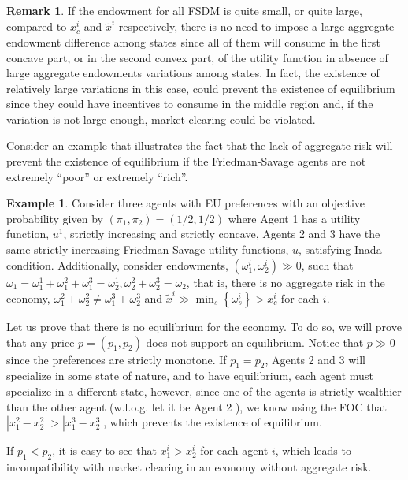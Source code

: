 \documentclass[pdftex]{article}
\numberwithin{equation}{section}
\theoremstyle{th}
\newtheorem{proof lemma}{{Proof Lemma}.}
\theoremstyle{definition}
\newtheorem{example}{Example}%
\newtheorem{remark}{Remark}%
\newtheorem*{risk lovers}{Risk lovers}
\newtheorem*{risk averse}{Risk averse}
\begin{document}
\begin{remark}
{If the endowment for all FSDM is quite small, or quite large, compared to $x^i_c$ and $\tilde{x}^i$ respectively, there is no need to impose a large aggregate endowment difference among states since all of them will consume in the first concave part, or in the second convex part, of the utility function in absence of large aggregate endowments variations among states. In fact, the existence of relatively large variations in this case, could prevent the existence of equilibrium since they could have incentives to consume in the middle region and, if the variation is not large enough, market clearing could be violated.}
\end{remark}

Consider an example that illustrates the fact that the lack of aggregate risk will prevent the existence of equilibrium if the Friedman-Savage agents are not extremely ``poor'' or extremely ``rich''.

\begin{example}
Consider three agents with EU preferences with an objective probability given by $(\pi_1,\pi_2)=(1/2,1/2)$ where Agent 1 has a utility function, $u^1$, strictly increasing and strictly concave, Agents 2 and 3 have the same strictly increasing Friedman-Savage utility functions, $u$, satisfying Inada condition. Additionally, consider endowments, $\left(\omega^i_1,\omega^i_2\right)\gg0$, such that $\omega_1=\omega^1_1+\omega^2_1+\omega^3_1=\omega^1_2,\omega^2_2+\omega^3_2=\omega_2$, that is, there is no aggregate risk in the economy, $\omega^2_1+\omega^2_2\neq\omega^3_1+\omega^3_2$ and $\tilde{x}^i\gg\min_s\left\{\omega^i_s\right\}>x^i_c$ for each $i$.

Let us prove that there is no equilibrium for the economy. To do so, we will prove that any price $p=(p_1,p_2)$ does not support an equilibrium. Notice that $p\gg0$ since the preferences are strictly monotone. If $p_1=p_2$, Agents 2 and 3 will specialize in some state of nature, and to have equilibrium, each agent must specialize in a different state, however, since one of the agents is strictly wealthier than the other agent (w.l.o.g. let it be Agent 2 ), we know using the FOC that $\left|x^2_1-x^2_2\right|>\left|x^3_1-x^3_2\right|$, which prevents the existence of equilibrium.

If $p_1<p_2$, it is easy to see that $x^i_1>x^i_2$ for each agent $i$, which leads to incompatibility with market clearing in an economy without aggregate risk.

\end{example}
\end{document}
